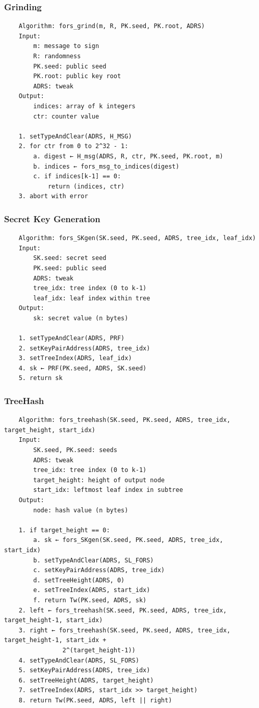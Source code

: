 \subsubsection{Grinding}
\begin{verbatim}
    Algorithm: fors_grind(m, R, PK.seed, PK.root, ADRS)
    Input:
        m: message to sign
        R: randomness
        PK.seed: public seed
        PK.root: public key root
        ADRS: tweak
    Output:
        indices: array of k integers
        ctr: counter value

    1. setTypeAndClear(ADRS, H_MSG)
    2. for ctr from 0 to 2^32 - 1:
        a. digest ← H_msg(ADRS, R, ctr, PK.seed, PK.root, m)
        b. indices ← fors_msg_to_indices(digest)
        c. if indices[k-1] == 0:
            return (indices, ctr)
    3. abort with error
\end{verbatim}

\subsubsection{Secret Key Generation}
\begin{verbatim}
    Algorithm: fors_SKgen(SK.seed, PK.seed, ADRS, tree_idx, leaf_idx)
    Input:
        SK.seed: secret seed
        PK.seed: public seed
        ADRS: tweak
        tree_idx: tree index (0 to k-1)
        leaf_idx: leaf index within tree
    Output:
        sk: secret value (n bytes)

    1. setTypeAndClear(ADRS, PRF)
    2. setKeyPairAddress(ADRS, tree_idx)
    3. setTreeIndex(ADRS, leaf_idx)
    4. sk ← PRF(PK.seed, ADRS, SK.seed)
    5. return sk
\end{verbatim}

\subsubsection{TreeHash}
\begin{verbatim}
    Algorithm: fors_treehash(SK.seed, PK.seed, ADRS, tree_idx, target_height, start_idx)
    Input:
        SK.seed, PK.seed: seeds
        ADRS: tweak
        tree_idx: tree index (0 to k-1)
        target_height: height of output node
        start_idx: leftmost leaf index in subtree
    Output:
        node: hash value (n bytes)

    1. if target_height == 0:
        a. sk ← fors_SKgen(SK.seed, PK.seed, ADRS, tree_idx, start_idx)
        b. setTypeAndClear(ADRS, SL_FORS)
        c. setKeyPairAddress(ADRS, tree_idx)
        d. setTreeHeight(ADRS, 0)
        e. setTreeIndex(ADRS, start_idx)
        f. return Tw(PK.seed, ADRS, sk)
    2. left ← fors_treehash(SK.seed, PK.seed, ADRS, tree_idx, target_height-1, start_idx)
    3. right ← fors_treehash(SK.seed, PK.seed, ADRS, tree_idx, target_height-1, start_idx + 
                2^(target_height-1))
    4. setTypeAndClear(ADRS, SL_FORS)
    5. setKeyPairAddress(ADRS, tree_idx)
    6. setTreeHeight(ADRS, target_height)
    7. setTreeIndex(ADRS, start_idx >> target_height)
    8. return Tw(PK.seed, ADRS, left || right)
\end{verbatim}

